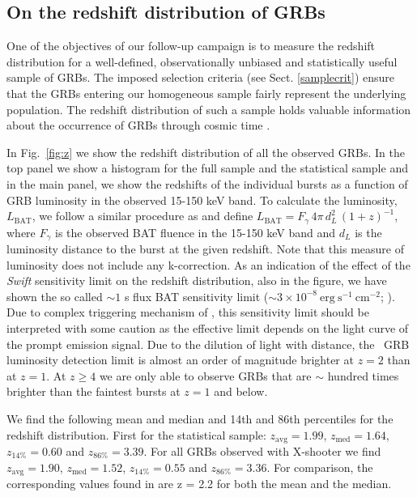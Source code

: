 \documentclass{aa}    %
\begin{document}
\subsection{On the redshift distribution of GRBs} \label{redshift}

One of the objectives of our follow-up campaign is to measure the redshift
distribution for a well-defined, observationally unbiased and statistically useful
sample of GRBs. The imposed selection criteria (see Sect. \ref{samplecrit})
ensure that the GRBs entering our homogeneous sample fairly represent  the
underlying population. The redshift distribution of such a sample holds valuable
information about the occurrence of GRBs through cosmic time
\citep{Jakobsson2012, Perley2016a}.

In Fig.~\ref{fig:z} we show the redshift distribution of all  the observed GRBs.
In the top panel we show a histogram for the full sample and the statistical
sample and in the main panel, we show the redshifts of the individual bursts as
a function of GRB luminosity in the observed 15-150 keV band. To calculate the
luminosity, $L_{\mathrm{BAT}}$, we follow a similar procedure as
\citet{Lien2016} and define $L_{\mathrm{BAT}} = F_{\gamma}\,4
\pi\,d_L^2\,(1+z)^{-1}$, where $F_{\gamma}$ is the observed BAT fluence in the
15-150 keV band and $d_L$ is the luminosity distance to the burst at the given
redshift. Note that this measure of luminosity does not include any
k-correction. As an indication of the effect of the \textit{Swift} sensitivity
limit on the redshift distribution, also in the figure, we have shown the so
called $\sim 1$ s flux BAT sensitivity limit ($\sim 3 \times
10^{-8}~\mathrm{erg}~\mathrm{s}^{-1}~\mathrm{cm}^{-2}$;
\citealt{Baumgartner2013, Lien2016}). Due to complex triggering mechanism of
\swift, this sensitivity limit should be interpreted with some caution as the
effective limit depends on the light curve of the prompt emission signal. Due to
the dilution of light with distance, the \swift~GRB luminosity detection limit
is almost an order of magnitude brighter at $z=2$ than at $z=1$. At $z\geq4$
we are only able to observe GRBs that are $\sim$ hundred times brighter than the
faintest bursts at $z=1$ and below.

We find the following mean and median and 14th and 86th percentiles for the
redshift distribution. First for the statistical sample:
$z_{\mathrm{avg}}=1.99$, $z_{\mathrm{med}}=1.64$, $z_{14\%}=0.60$ and
$z_{86\%}=3.39$. For all GRBs observed with X-shooter we find
$z_{\mathrm{avg}}=1.90$, $z_{\mathrm{med}}=1.52$, $z_{14\%}=0.55$ and
$z_{86\%}=3.36$. For comparison, the corresponding values found in
\citet{Fynbo2009} are z = 2.2 for both the mean and the median.
\end{document}
